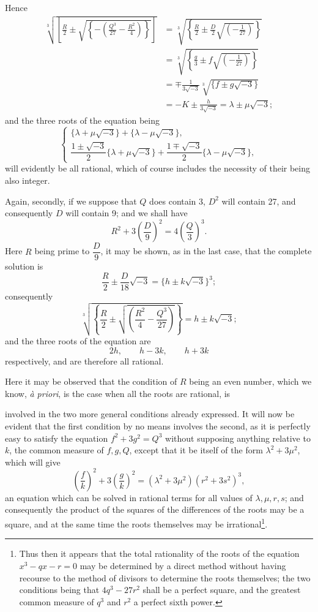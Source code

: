 \documentclass[11pt]{article}
\newcommand{\sourcepage}[1]{\marginpar{\scriptsize p.~#1}}
\begin{document}
{{Hence
\[
\begin{aligned}
\sqrt[3]{\left[\frac{R}{2}\pm\sqrt{\left\{-\left(\frac{Q^3}{27}-\frac{R^2}{4}\right)\right\}}\right]}
&=\sqrt[3]{\left\{\frac{R}{2}\pm\frac{D}{2}\sqrt{\left(-\frac{1}{27}\right)}\right\}}\\
&=\sqrt[3]{\left\{\frac{g}{3}\pm f\sqrt{\left(-\frac{1}{27}\right)}\right\}}\\
&=\mp\frac{1}{3\sqrt{-3}}\sqrt[3]{\{f\pm g\sqrt{-3}\}}\\
&=-K\pm\frac{h}{3\sqrt{-3}}=\lambda\pm\mu\sqrt{-3};
\end{aligned}
\]
and the three roots of the equation being
\[
\left\{\begin{array}{l}
\{\lambda+\mu\sqrt{-3}\}+\{\lambda-\mu\sqrt{-3}\},\\[0.4em]
\dfrac{1\pm\sqrt{-3}}{2}\{\lambda+\mu\sqrt{-3}\}+\dfrac{1\mp\sqrt{-3}}{2}\{\lambda-\mu\sqrt{-3}\},
\end{array}\right.
\]
will evidently be all rational, which of course includes the necessity of their being also integer.

Again, secondly, if we suppose that $Q$ does contain 3, $D^2$ will contain 27, and consequently $D$ will contain 9; and we shall have
\[
R^2+3\left(\frac{D}{9}\right)^2=4\left(\frac{Q}{3}\right)^3.
\]
Here $R$ being prime to $\dfrac{D}{9}$, it may be shown, as in the last case, that the complete solution is
\[
\frac{R}{2}\pm\frac{D}{18}\sqrt{-3}=\{h\pm k\sqrt{-3}\}^3;
\]
consequently
\[
\sqrt[3]{\left\{\frac{R}{2}\pm\sqrt{\left(\frac{R^2}{4}-\frac{Q^3}{27}\right)}\right\}}=h\pm k\sqrt{-3};
\]
and the three roots of the equation are
\[
2h,\qquad h-3k,\qquad h+3k
\]
respectively, and are therefore all rational.

Here it may be observed that the condition of $R$ being an even number, which we know, \emph{\`a priori}, is the case when all the roots are rational, is

\sourcepage{106}
involved in the two more general conditions already expressed. It will now be evident that the first condition by no means involves the second, as it is perfectly easy to satisfy the equation $f^2+3g^2=Q^3$ without supposing anything relative to $k$, the common measure of $f,g,Q$, except that it be itself of the form $\lambda^2+3\mu^2$, which will give
\[
\left(\frac{f}{k}\right)^2+3\left(\frac{g}{k}\right)^2=(\lambda^2+3\mu^2)(r^2+3s^2)^3,
\]
an equation which can be solved in rational terms for all values of $\lambda,\mu,r,s$; and consequently the product of the squares of the differences of the roots may be a square, and at the same time the roots themselves may be irrational\footnote{Thus then it appears that the total rationality of the roots of the equation $x^3-qx-r=0$ may be determined by a direct method without having recourse to the method of divisors to determine the roots themselves; the two conditions being that $4q^3-27r^2$ shall be a perfect square, and the greatest common measure of $q^3$ and $r^2$ a perfect sixth power.}.

}}
\end{document}
